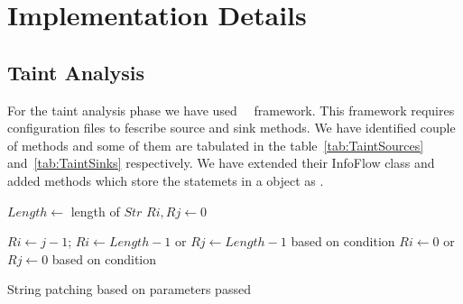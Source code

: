 \section{Implementation Details}
\label{sec:iimplementation}

\subsection{Taint Analysis}

For the taint analysis phase we have used \soot\ \infoflow\ framework. This
framework requires configuration files to fescribe source and sink methods. We
have identified couple of methods and some of them are tabulated in the
table~\ref{tab:TaintSources} and~\ref{tab:TaintSinks} respectively. We have
extended their InfoFlow class and added methods which store the statemets in a
 object as . 


\begin{algorithm}
\small
\DontPrintSemicolon
{}
\Begin
{
	$Length \longleftarrow$ length of $Str$\;
	{
		$Ri, Rj \longleftarrow 0$\;
	}
	\Else
	{
		{
			$Ri \longleftarrow j - 1$;
		}
		{
			$Ri \longleftarrow Length - 1$ or $Rj \longleftarrow Length - 1$ based on
			condition\; 
		}
		{
			$Ri \longleftarrow 0$ or $Rj \longleftarrow 0$ based on
			condition\; 
		}
		
		
	}	

}
\caption{String patching based on parameters passed}
\label{algo:stringPatchParametr}
\end{algorithm}